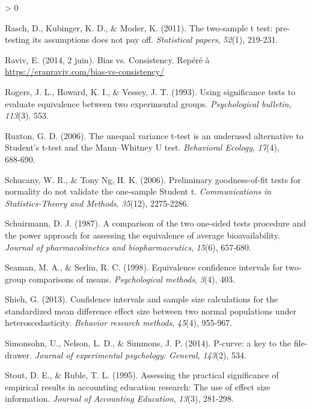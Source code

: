 \documentclass[
  12pt,
  french,
]{article}
\newlength{\cslhangindent}
\newenvironment{CSLReferences}[2] %
 {%
  \setlength{\parindent}{0pt}
  \ifodd #1 \everypar{\setlength{\hangindent}{\cslhangindent}}\ignorespaces\fi
  \ifnum #2 > 0
  \setlength{\parskip}{#2\baselineskip}
  \fi
 }%
 {}
\begin{document}
\begin{CSLReferences}{1}{0}
\leavevmode\hypertarget{ref-rasch_two-sample_2011}{}%
Rasch, D., Kubinger, K. D., \& Moder, K. (2011). The two-sample t test:
pre-testing its assumptions does not pay off. \emph{Statistical papers},
\emph{52}(1), 219‑231.

\leavevmode\hypertarget{ref-raviv_bias_2014}{}%
Raviv, E. (2014, 2 juin). Bias vs. Consistency. Repéré à
\url{https://eranraviv.com/bias-vs-consistency/}

\leavevmode\hypertarget{ref-rogers_using_1993}{}%
Rogers, J. L., Howard, K. I., \& Vessey, J. T. (1993). Using
significance tests to evaluate equivalence between two experimental
groups. \emph{Psychological bulletin}, \emph{113}(3), 553.

\leavevmode\hypertarget{ref-ruxton_unequal_2006}{}%
Ruxton, G. D. (2006). The unequal variance t-test is an underused
alternative to Student's t-test and the Mann--Whitney U test.
\emph{Behavioral Ecology}, \emph{17}(4), 688‑690.

\leavevmode\hypertarget{ref-schucany_preliminary_2006}{}%
Schucany, W. R., \& Tony Ng, H. K. (2006). Preliminary goodness-of-fit
tests for normality do not validate the one-sample Student t.
\emph{Communications in Statistics-Theory and Methods}, \emph{35}(12),
2275‑2286.

\leavevmode\hypertarget{ref-schuirmann_comparison_1987}{}%
Schuirmann, D. J. (1987). A comparison of the two one-sided tests
procedure and the power approach for assessing the equivalence of
average bioavailability. \emph{Journal of pharmacokinetics and
biopharmaceutics}, \emph{15}(6), 657‑680.

\leavevmode\hypertarget{ref-seaman_equivalence_1998}{}%
Seaman, M. A., \& Serlin, R. C. (1998). Equivalence confidence intervals
for two-group comparisons of means. \emph{Psychological methods},
\emph{3}(4), 403.

\leavevmode\hypertarget{ref-shieh_confidence_2013}{}%
Shieh, G. (2013). Confidence intervals and sample size calculations for
the standardized mean difference effect size between two normal
populations under heteroscedasticity. \emph{Behavior research methods},
\emph{45}(4), 955‑967.

\leavevmode\hypertarget{ref-simonsohn_p-curve_2014}{}%
Simonsohn, U., Nelson, L. D., \& Simmons, J. P. (2014). P-curve: a key
to the file-drawer. \emph{Journal of experimental psychology: General},
\emph{143}(2), 534.

\leavevmode\hypertarget{ref-stout_assessing_1995}{}%
Stout, D. E., \& Ruble, T. L. (1995). Assessing the practical
significance of empirical results in accounting education research: The
use of effect size information. \emph{Journal of Accounting Education},
\emph{13}(3), 281‑298.


\end{CSLReferences}
\end{document}
